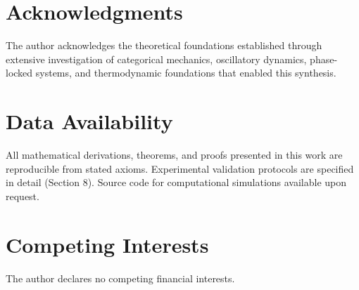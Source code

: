\documentclass[11pt,a4paper]{article}
\theoremstyle{definition}
\theoremstyle{remark}
\begin{document}
\section*{Acknowledgments}

The author acknowledges the theoretical foundations established through extensive investigation of categorical mechanics, oscillatory dynamics, phase-locked systems, and thermodynamic foundations that enabled this synthesis.

\section*{Data Availability}

All mathematical derivations, theorems, and proofs presented in this work are reproducible from stated axioms. Experimental validation protocols are specified in detail (Section 8). Source code for computational simulations available upon request.

\section*{Competing Interests}

The author declares no competing financial interests.
\end{document}
